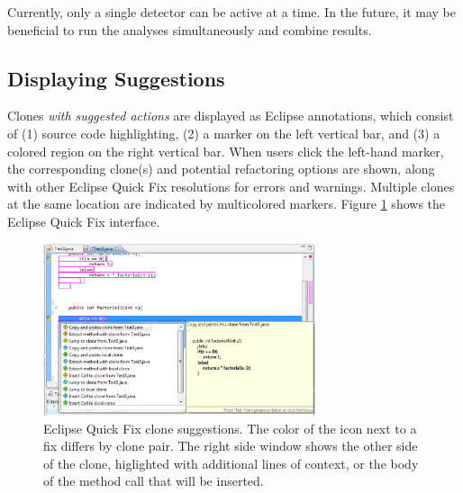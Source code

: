 \documentclass[nocopyrightspace,10pt]{sigplanconf}
\begin{document}


Currently, only a single detector can be active at a time. In the
future, it may be beneficial to run the analyses simultaneously and
combine results.

\subsection{Displaying Suggestions}
\label{sec:display}
Clones \emph{with suggested actions} are displayed as Eclipse
annotations, which consist of (1) source code highlighting, (2) a
marker on the left vertical bar, and (3) a colored region on the right
vertical bar.
When users click the left-hand marker,
the corresponding clone(s) and potential refactoring options are shown,
along with other Eclipse Quick Fix resolutions for errors and warnings.
Multiple clones at the same location are indicated by multicolored markers.
Figure \ref{fig:screenshot} shows the Eclipse Quick Fix interface.

\begin{figure}[here]
\centering
\includegraphics[width=80mm]{img/screen1.eps}
\caption{Eclipse Quick Fix clone suggestions. The color of the icon
  next to a fix differs by clone pair. The right side window shows the
  other side of the clone, higlighted with additional lines of
  context, or the body of the method call that will be inserted.}
\label{fig:screenshot}
\end{figure}
\end{document}
